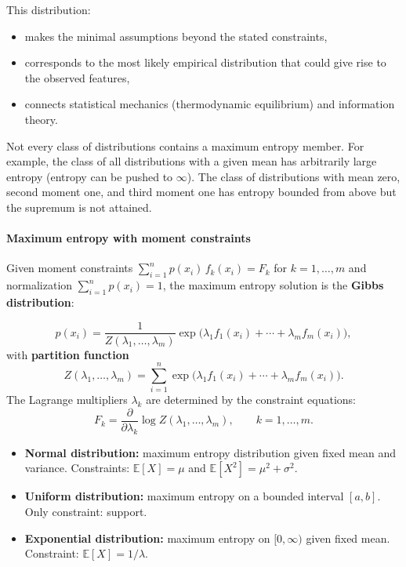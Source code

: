 \documentclass[11pt, oneside]{book}
\newcommand{\E}{\mathbb{E}}
\newcommand{\pd}[2]{\frac{\partial #1}{\partial #2}}
\begin{document}
This distribution:
\begin{itemize}
  \item makes the minimal assumptions beyond the stated constraints,
  \item corresponds to the most likely empirical distribution that could give rise to the
        observed features,
  \item connects statistical mechanics (thermodynamic equilibrium) and information theory.
\end{itemize}

\begin{notebox}[title={Existence caveat}]
Not every class of distributions contains a maximum entropy member.
For example, the class of all distributions with a given mean has arbitrarily large
entropy (entropy can be pushed to $\infty$).
The class of distributions with mean zero, second moment one, and third moment one has
entropy bounded from above but the supremum is not attained.
\end{notebox}

\paragraph{Maximum entropy with moment constraints}
Given moment constraints $\sum_{i=1}^n p(x_i)\,f_k(x_i) = F_k$ for $k=1,\ldots,m$
and normalization $\sum_{i=1}^n p(x_i) = 1$, the maximum entropy solution is the
\textbf{Gibbs distribution}:

\begin{thmbox}[title={Gibbs Distribution (MaxEnt Solution)}]
\[
  p(x_i) = \frac{1}{Z(\lambda_1,\ldots,\lambda_m)}
  \exp\!\bigl(\lambda_1 f_1(x_i) + \cdots + \lambda_m f_m(x_i)\bigr),
\]
with \textbf{partition function}
\[
  Z(\lambda_1,\ldots,\lambda_m) = \sum_{i=1}^n \exp\!\bigl(\lambda_1 f_1(x_i) + \cdots + \lambda_m f_m(x_i)\bigr).
\]
The Lagrange multipliers $\lambda_k$ are determined by the constraint equations:
\[
  F_k = \pd{}{\lambda_k} \log Z(\lambda_1,\ldots,\lambda_m), \qquad k = 1,\ldots,m.
\]
\end{thmbox}

\begin{exbox}[title={Standard MaxEnt examples}]
\begin{itemize}
  \item \textbf{Normal distribution:} maximum entropy distribution given fixed mean and
        variance. Constraints: $\E[X] = \mu$ and $\E[X^2] = \mu^2 + \sigma^2$.
  \item \textbf{Uniform distribution:} maximum entropy on a bounded interval $[a,b]$.
        Only constraint: support.
  \item \textbf{Exponential distribution:} maximum entropy on $[0,\infty)$ given fixed mean.
        Constraint: $\E[X] = 1/\lambda$.
\end{itemize}
\end{exbox}
\end{document}
